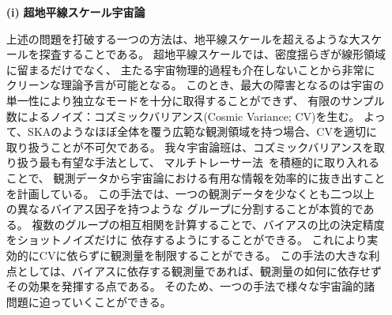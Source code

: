 \begin{enumerate}
\item[{\bf (i)}] {\bf 超地平線スケール宇宙論}

上述の問題を打破する一つの方法は、地平線スケールを超えるような大スケールを探査することである。
超地平線スケールでは、密度揺らぎが線形領域に留まるだけでなく、
主たる宇宙物理的過程も介在しないことから非常にクリーンな理論予言が可能となる。
このとき、最大の障害となるのは宇宙の単一性により独立なモードを十分に取得することができず、
有限のサンプル数によるノイズ：コズミックバリアンス(Cosmic Variance; CV)を生む。
よって、SKAのようなほぼ全体を覆う広範な観測領域を持つ場合、CVを適切に取り扱うことが不可欠である。
我々宇宙論班は、コズミックバリアンスを取り扱う最も有望な手法として、
マルチトレーサー法~\citep{Seljak:2008xr}を積極的に取り入れることで、
観測データから宇宙論における有用な情報を効率的に抜き出すことを計画している。
この手法では、一つの観測データを少なくとも二つ以上の異なるバイアス因子を持つような
グループに分割することが本質的である。
複数のグループの相互相関を計算することで、バイアスの比の決定精度をショットノイズだけに
依存するようにすることができる。
これにより実効的にCVに依らずに観測量を制限することができる。
この手法の大きな利点としては、バイアスに依存する観測量であれば、観測量の如何に依存せずその効果を発揮する点である。
そのため、一つの手法で様々な宇宙論的諸問題に迫っていくことができる。

\end{enumerate}
